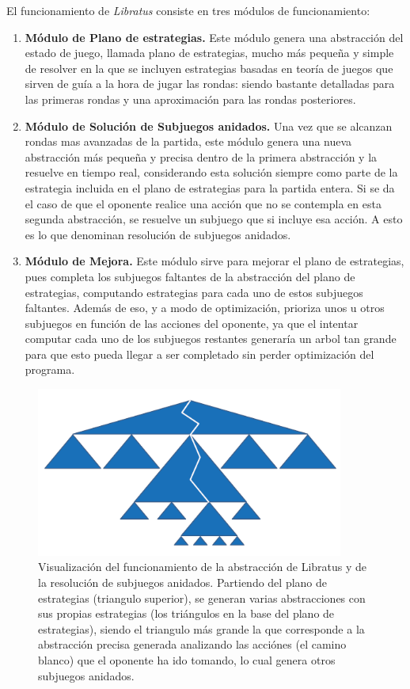El funcionamiento de \textit{Libratus} consiste en tres módulos de funcionamiento:
\begin{enumerate}
\item  \textbf{Módulo de Plano de estrategias.} Este módulo genera una abstracción del estado de juego, llamada plano de estrategias, mucho más pequeña y simple de resolver en la que se incluyen estrategias basadas en teoría de juegos que sirven de guía a la hora de jugar las rondas: siendo bastante detalladas para las primeras rondas y una aproximación para las rondas posteriores.
\item \textbf{Módulo de Solución de Subjuegos anidados.} Una vez que se alcanzan rondas mas avanzadas de la partida, este módulo genera una nueva abstracción más pequeña y precisa dentro de la primera abstracción y la resuelve en tiempo real, considerando esta solución siempre como parte de la estrategia incluida en el plano de estrategias para la partida entera. Si se da el caso de que el oponente realice una acción que no se contempla en esta segunda abstracción, se resuelve un subjuego que si incluye esa acción. A esto es lo que denominan resolución de subjuegos anidados.
\item \textbf{Módulo de Mejora.} Este módulo sirve para mejorar el plano de estrategias, pues completa los subjuegos faltantes de la abstracción del plano de estrategias, computando estrategias para cada uno de estos subjuegos faltantes. Además de eso, y a modo de optimización, prioriza unos u otros subjuegos en función de las acciones del oponente, ya que el intentar computar cada uno de los subjuegos restantes generaría un arbol tan grande para que esto pueda llegar a ser completado sin perder optimización del programa.
\end{enumerate}

\begin{figure}[h]
\centering
\includegraphics[width=0.9\textwidth]{figuras/Libratus.png}   
\caption{Visualización del funcionamiento de la abstracción de Libratus \cite{libratusScience2} y de la resolución de subjuegos anidados. Partiendo del plano de estrategias (triangulo superior), se generan varias abstracciones con sus propias estrategias (los triángulos en la base del plano de estrategias), siendo el triangulo más grande la que corresponde a la abstracción precisa generada analizando las acciónes (el camino blanco) que el oponente ha ido tomando, lo cual genera otros subjuegos anidados.}
\label{fig:libratus}
\end{figure}

